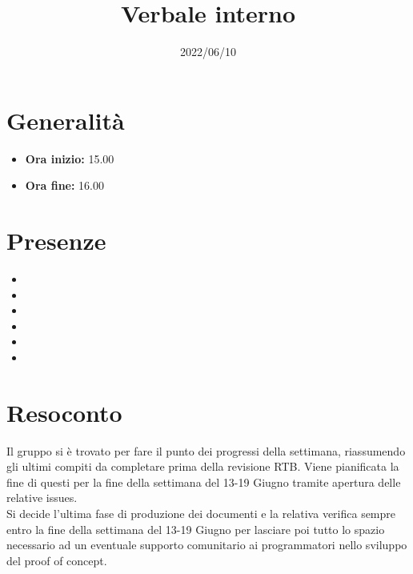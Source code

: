 \documentclass{classes/base}
\title{Verbale interno}
\date{2022/06/10}
\author{\marcob}
\renewcommand{\maketitle}{
    
}
\begin{document}
    \maketitle

    \section*{Generalità}
    \begin{itemize}
        \item \textbf{Ora inizio:} 15.00
        \item \textbf{Ora fine:} 16.00
    \end{itemize}

    \section*{Presenze}
    \begin{itemize}
        \item \marcob
        \item \angela
        \item \marcov
        \item \giulio
        \item \matteo
        \item \tommaso
    \end{itemize}

    \section*{Resoconto}
    Il gruppo si è trovato per fare il punto dei progressi della settimana, riassumendo 
    gli ultimi compiti da completare prima della revisione RTB. Viene pianificata la fine 
    di questi per la fine della settimana del 13-19 Giugno tramite apertura delle relative issues.\\ 
    Si decide l’ultima fase di produzione dei documenti e la relativa verifica sempre entro la fine 
    della settimana del 13-19 Giugno per lasciare poi tutto lo spazio necessario ad un eventuale 
    supporto comunitario ai programmatori nello sviluppo del proof of concept.
\end{document}
